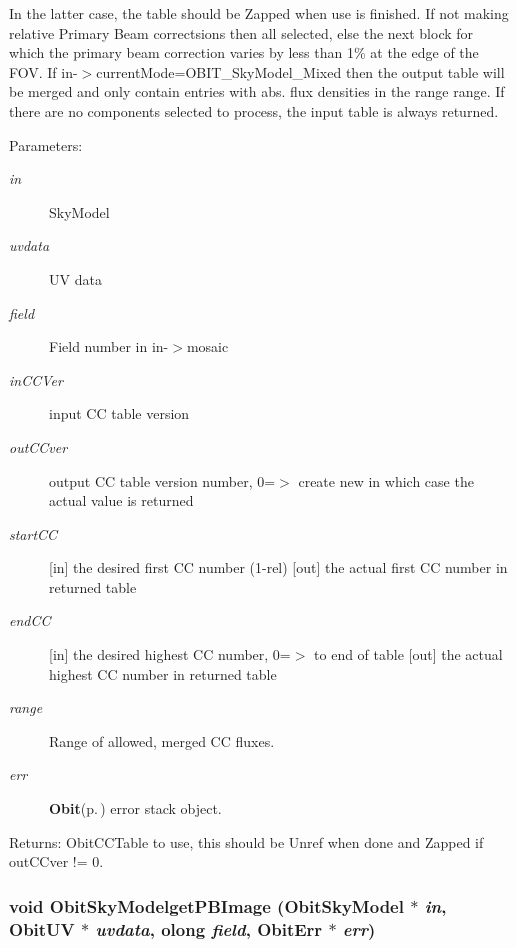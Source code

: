 In the latter case, the table should be Zapped when use is finished. If not making relative Primary Beam correctsions then all selected, else the next block for which the primary beam correction varies by less than 1\% at the edge of the FOV. If in-$>$current\-Mode=OBIT\_\-Sky\-Model\_\-Mixed then the output table will be merged and only contain entries with abs. flux densities in the range range. If there are no components selected to process, the input table is always returned. \begin{Desc}
\item[Parameters:]
\begin{description}
\item[{\em in}]Sky\-Model \item[{\em uvdata}]UV data \item[{\em field}]Field number in in-$>$mosaic \item[{\em in\-CCVer}]input CC table version \item[{\em out\-CCver}]output CC table version number, 0=$>$ create new in which case the actual value is returned \item[{\em start\-CC}][in] the desired first CC number (1-rel) [out] the actual first CC number in returned table \item[{\em end\-CC}][in] the desired highest CC number, 0=$>$ to end of table [out] the actual highest CC number in returned table \item[{\em range}]Range of allowed, merged CC fluxes. \item[{\em err}]{\bf Obit}{\rm (p.\,\pageref{structObit})} error stack object. \end{description}
\end{Desc}
\begin{Desc}
\item[Returns:]Obit\-CCTable to use, this should be Unref when done and Zapped if out\-CCver != 0. \end{Desc}
\subsubsection{\setlength{\rightskip}{0pt plus 5cm}void Obit\-Sky\-Modelget\-PBImage ({\bf Obit\-Sky\-Model} $\ast$ {\em in}, {\bf Obit\-UV} $\ast$ {\em uvdata}, {\bf olong} {\em field}, {\bf Obit\-Err} $\ast$ {\em err})}\label{ObitSkyModel_8h_a74}


